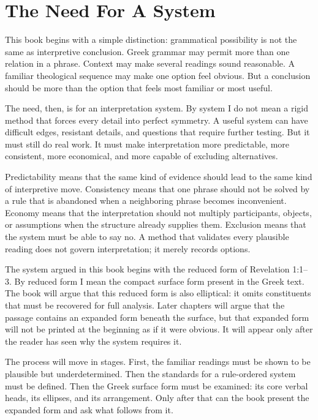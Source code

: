 \section{The Need For A System}

This book begins with a simple distinction: grammatical possibility is not the same as interpretive conclusion. Greek grammar may permit more than one relation in a phrase. Context may make several readings sound reasonable. A familiar theological sequence may make one option feel obvious. But a conclusion should be more than the option that feels most familiar or most useful.

The need, then, is for an interpretation system. By system I do not mean a rigid method that forces every detail into perfect symmetry. A useful system can have difficult edges, resistant details, and questions that require further testing. But it must still do real work. It must make interpretation more predictable, more consistent, more economical, and more capable of excluding alternatives.

Predictability means that the same kind of evidence should lead to the same kind of interpretive move. Consistency means that one phrase should not be solved by a rule that is abandoned when a neighboring phrase becomes inconvenient. Economy means that the interpretation should not multiply participants, objects, or assumptions when the structure already supplies them. Exclusion means that the system must be able to say no. A method that validates every plausible reading does not govern interpretation; it merely records options.

The system argued in this book begins with the reduced form of Revelation 1:1--3. By reduced form I mean the compact surface form present in the Greek text. The book will argue that this reduced form is also elliptical: it omits constituents that must be recovered for full analysis. Later chapters will argue that the passage contains an expanded form beneath the surface, but that expanded form will not be printed at the beginning as if it were obvious. It will appear only after the reader has seen why the system requires it.

The process will move in stages. First, the familiar readings must be shown to be plausible but underdetermined. Then the standards for a rule-ordered system must be defined. Then the Greek surface form must be examined: its core verbal heads, its ellipses, and its arrangement. Only after that can the book present the expanded form and ask what follows from it.

